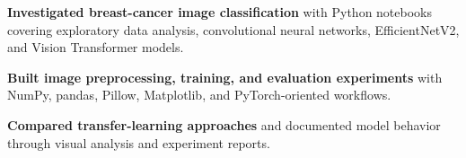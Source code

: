 \begin{bullets}
    \item \textbf{Investigated breast-cancer image classification} with Python notebooks covering exploratory data analysis, convolutional neural networks, EfficientNetV2, and Vision Transformer models.
    \item \textbf{Built image preprocessing, training, and evaluation experiments} with NumPy, pandas, Pillow, Matplotlib, and PyTorch-oriented workflows.
    \item \textbf{Compared transfer-learning approaches} and documented model behavior through visual analysis and experiment reports.
\end{bullets}